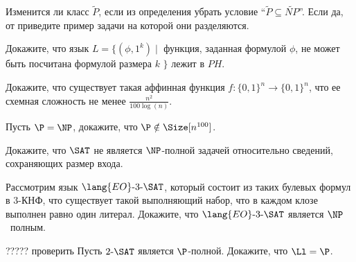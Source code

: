 \setcounter{curtask}{1}

\begin{task}
    Изменится ли класс $\widetilde{P}$, если из определения убрать условие ``$\widetilde{P} \subseteq \widetilde{NP}$''. Если да,
    от приведите пример задачи на которой они разделяются.
\end{task}

\begin{task}
    Докажите, что язык $L = \{(\phi, 1^k) \mid$ функция, заданная формулой $\phi$, не может быть посчитана формулой размера $k$ $\}$
    лежит в $PH$.
\end{task}


\begin{task}
    Докажите, что существует такая аффинная функция $f: \{0, 1\}^{n} \to \{0, 1\}^{n}$, что ее схемная сложность не менее
    $\frac{n^2}{100 \log(n)}$.  
\end{task}


\begin{task}
    Пусть $\P = \NP$, докажите, что $\P \notin \Size[n^{100}]$.
\end{task}

\begin{task}
	Докажите, что $\SAT$ не является $\NP$-полной задачей относительно сведений, сохраняющих размер входа.
\end{task}

\begin{task}
    Рассмотрим язык $\lang{EO}\text{-}3\text{-}\SAT$, который состоит из таких булевых формул в $3$-КНФ, что существует такой
    выполняющий набор, что в каждом клозе выполнен равно один литерал. Докажите, что $\lang{EO}\text{-}3\text{-}\SAT$ является
    $\NP$~полным.
\end{task}

\begin{task}{????? проверить}
	Пусть $2\text{-}\SAT$ является $\P$-полной. Докажите, что $\Ll = \P$.
\end{task}
